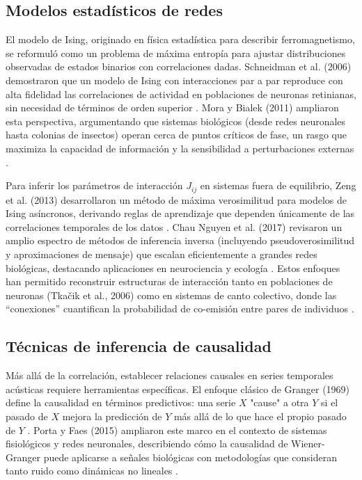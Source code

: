 \subsection{Modelos estadísticos de redes}
El modelo de Ising, originado en física estadística para 
describir ferromagnetismo, se reformuló como un problema de 
máxima entropía para ajustar distribuciones observadas de 
estados binarios con correlaciones dadas. Schneidman et al. 
(2006) demostraron que un modelo de Ising con interacciones 
par a par reproduce con alta fidelidad las correlaciones de 
actividad en poblaciones de neuronas retinianas, sin necesidad 
de términos de orden superior \cite{schneidman2006weak}. Mora y 
Bialek (2011) ampliaron esta perspectiva, argumentando que 
sistemas biológicos (desde redes neuronales hasta colonias de 
insectos) operan cerca de puntos críticos de fase, un rasgo que 
maximiza la capacidad de información y la sensibilidad a 
perturbaciones externas \cite{mora2011biological}.  

Para inferir los parámetros de interacción \(J_{ij}\) en 
sistemas fuera de equilibrio, Zeng et al. (2013) desarrollaron 
un método de máxima verosimilitud para modelos de Ising 
asíncronos, derivando reglas de aprendizaje que dependen 
únicamente de las correlaciones temporales de los datos 
\cite{zeng2013maximum}. Chau Nguyen et al. (2017) revisaron un 
amplio espectro de métodos de inferencia inversa (incluyendo 
pseudoverosimilitud y aproximaciones de mensaje) que escalan 
eficientemente a grandes redes biológicas, destacando 
aplicaciones en neurociencia y ecología \cite{chau2017inverse}. 
Estos enfoques han permitido reconstruir estructuras de 
interacción tanto en poblaciones de neuronas 
(Tkačik et al., 2006) como en sistemas de canto colectivo, donde 
las “conexiones” cuantifican la probabilidad de co-emisión entre 
pares de individuos \cite{tkacik2006ising}.

\subsection{Técnicas de inferencia de causalidad}
Más allá de la correlación, establecer relaciones causales en 
series temporales acústicas requiere herramientas específicas. 
El enfoque clásico de Granger (1969) define la causalidad en 
términos predictivos: una serie \(X\) "cause" a otra \(Y\) si 
el pasado de \(X\) mejora la predicción de \(Y\) más allá de lo 
que hace el propio pasado de \(Y\) \cite{granger1969investigating}. 
Porta y Faes (2015) ampliaron este marco en el contexto de 
sistemas fisiológicos y redes neuronales, describiendo cómo la 
causalidad de Wiener-Granger puede aplicarse a señales 
biológicas con metodologías que consideran tanto ruido como 
dinámicas no lineales \cite{porta2015wiener}.  



